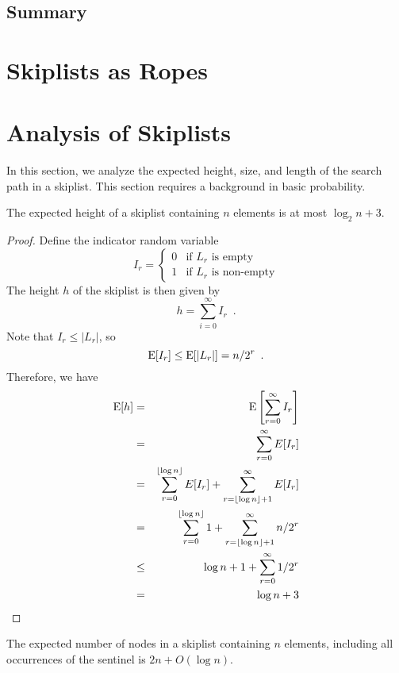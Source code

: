 \subsection{Summary}


\section{Skiplists as Ropes}

\section{Analysis of Skiplists}

In this section, we analyze the expected height, size, and length of
the search path in a skiplist.  This section requires a background in
basic probability.

\begin{lem}
  The expected height of a skiplist containing $n$ elements is at most
  $\log_2 n + 3$.
\end{lem}

\begin{proof}
  Define the indicator random variable
  \[ I_r = \left\{\begin{array}{ll}
     0 & \mbox{if $L_r$ is empty} \\
     1 & \mbox{if $L_r$ is non-empty}
     \end{array}\right.
  \]
  The height $h$ of the skiplist is then given by
  \[
       h = \sum_{i=0}^\infty I_r \enspace .
  \]
  Note that $I_r \le |L_r|$, so 
  \[
     \mathrm{E}[I_r] \le \mathrm{E}[|L_r|] = n/2^r \enspace .
  \]
  Therefore, we have
  \begin{eqnarray*}
       \mathrm{E}[h] &=& \mathrm{E}\left[\sum_{r=0}^\infty I_r\right] \\
        &=& \sum_{r=0}^{\infty} E[I_r] \\
        &=& \sum_{r=0}^{\lfloor\log n\rfloor} E[I_r]
                 + \sum_{r=\lfloor\log n\rfloor+1}^{\infty} E[I_r]  \\
        &=& \sum_{r=0}^{\lfloor\log n\rfloor} 1
                 + \sum_{r=\lfloor\log n\rfloor+1}^{\infty} n/2^r \\
        &\le& \log n + 1
                 + \sum_{r=0}^\infty 1/2^r \\
        &=& \log n + 3
  \end{eqnarray*}
\end{proof}

\begin{lem}
  The expected number of nodes in a skiplist containing $n$ elements,
  including all occurrences of the sentinel is $2n+O(\log n)$.
\end{lem}

